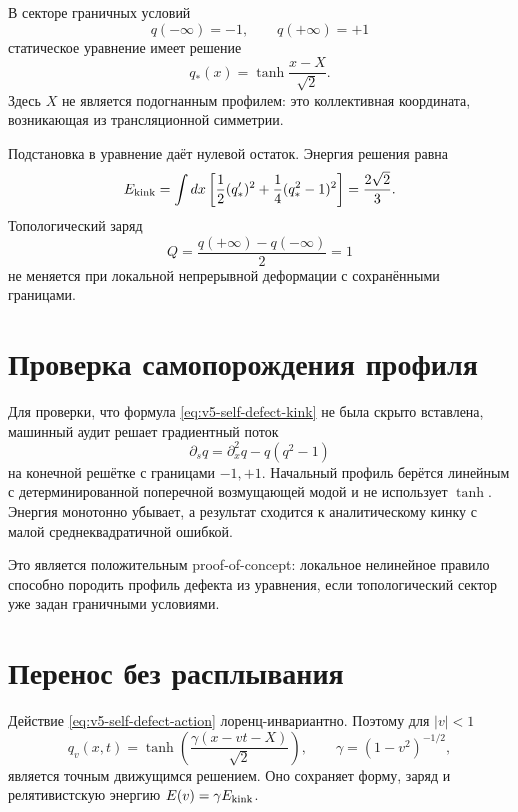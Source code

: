 В секторе граничных условий
\begin{equation}
 q(-\infty)=-1,
 \qquad
 q(+\infty)=+1
 \label{eq:v5-self-defect-boundary}
\end{equation}
статическое уравнение имеет решение
\begin{equation}
 q_*(x)=\tanh\frac{x-X}{\sqrt2}.
 \label{eq:v5-self-defect-kink}
\end{equation}
Здесь $X$ не является подогнанным профилем: это коллективная координата,
возникающая из трансляционной симметрии.

Подстановка в уравнение даёт нулевой остаток. Энергия решения равна
\begin{equation}
 E_{\rm kink}=\int dx\left[
 \frac12(q_*')^2+\frac14(q_*^2-1)^2
 \right]=\frac{2\sqrt2}{3}.
 \label{eq:v5-self-defect-energy}
\end{equation}
Топологический заряд
\begin{equation}
 Q=\frac{q(+\infty)-q(-\infty)}2=1
 \label{eq:v5-self-defect-charge}
\end{equation}
не меняется при локальной непрерывной деформации с сохранёнными границами.

\section{Проверка самопорождения профиля}

Для проверки, что формула \eqref{eq:v5-self-defect-kink} не была скрыто
вставлена, машинный аудит решает градиентный поток
\begin{equation}
 \partial_s q=\partial_x^2q-q(q^2-1)
 \label{eq:v5-self-defect-gradient-flow}
\end{equation}
на конечной решётке с границами $-1,+1$. Начальный профиль берётся
линейным с детерминированной поперечной возмущающей модой и не использует
$\tanh$. Энергия монотонно убывает, а результат сходится к аналитическому
кинку с малой среднеквадратичной ошибкой.

Это является положительным proof-of-concept: локальное нелинейное правило
способно породить профиль дефекта из уравнения, если топологический сектор
уже задан граничными условиями.

\section{Перенос без расплывания}

Действие \eqref{eq:v5-self-defect-action} лоренц-инвариантно. Поэтому для
$|v|<1$
\begin{equation}
 q_v(x,t)=
 \tanh\!\left(
 \frac{\gamma(x-vt-X)}{\sqrt2}
 \right),
 \qquad
 \gamma=(1-v^2)^{-1/2},
 \label{eq:v5-self-defect-moving}
\end{equation}
является точным движущимся решением. Оно сохраняет форму, заряд и
релятивистскую энергию $E(v)=\gamma E_{\rm kink}$.

